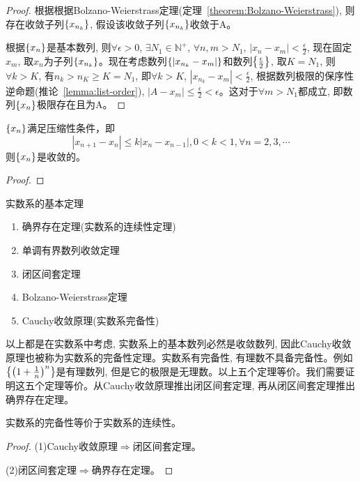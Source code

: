 \documentclass[lang=cn]{elegantbook}
\begin{document}
\begin{proof}
根据根据Bolzano-Weierstrass定理(定理~\ref{theorem:Bolzano-Weierstrass}), 则存在收敛子列$\left\{ x_{n_k}\right\}$, 假设该收敛子列$\left\{ x_{n_k}\right\}$收敛于A。

根据$\left\{ x_n\right\}$是基本数列, 则$\forall \epsilon > 0$, $\exists N_1 \in \mathbb{N}^+$, $\forall n, m > N_1$, $\left| x_n - x_m \right| < \frac{\epsilon}{2}$, 现在固定$x_m$, 取$x_n$为子列$\left\{ x_{n_k}\right\}$。现在考虑数列$\left\{ \left| x_{n_k}  - x_m\right|\right\}$和数列$\left\{ \frac{\epsilon}{2}\right\}$, 取$K = N_1$, 则$\forall k > K$, 有$n_k > n_K \ge K = N_1$, 即$\forall k > K$, $\left| x_{n_k}  - x_m\right| < \frac{\epsilon}{2}$, 根据数列极限的保序性逆命题(推论~\ref{lemma:list-order}), $\left| A - x_m\right| \le \frac{\epsilon}{2} < \epsilon$。这对于$\forall m > N_1$都成立, 即数列$\left\{ x_n\right\}$极限存在且为A。
\end{proof}

\begin{proposition}
    $\left\{ x_n\right\}$满足压缩性条件，即
    \[ \left| x_{n+1} -x_n \right| \le k\left| x_n - x_{n-1}\right|, 0 < k < 1, \forall n = 2, 3, \cdots \] 
    则$\left\{ x_n\right\}$是收敛的。
\end{proposition}
\begin{proof}

\end{proof}

实数系的基本定理
\begin{enumerate}
    \item 确界存在定理(实数系的连续性定理)
    \item 单调有界数列收敛定理
    \item 闭区间套定理
    \item Bolzano-Weierstrass定理
    \item Cauchy收敛原理(实数系完备性)
\end{enumerate}
以上都是在实数系中考虑, 实数系上的基本数列必然是收敛数列, 因此Cauchy收敛原理也被称为实数系的完备性定理。实数系有完备性, 有理数不具备完备性。例如$\left\{ \left( 1 + \frac{1}{n}\right)^n\right\}$是有理数列, 但是它的极限是无理数。以上五个定理等价。我们需要证明这五个定理等价。从Cauchy收敛原理推出闭区间套定理, 再从闭区间套定理推出确界存在定理。
\begin{theorem}
    实数系的完备性等价于实数系的连续性。
\end{theorem}
\begin{proof}
    (1)Cauchy收敛原理$\Rightarrow$闭区间套定理。

    (2)闭区间套定理$\Rightarrow$确界存在定理。
\end{proof}
\end{document}
